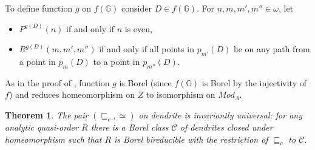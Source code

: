 \documentclass{amsart}
\newtheorem{theorem}{Theorem}[section]
\theoremstyle{definition}
\theoremstyle{remark}
\begin{document}
To define function $g$ on $f( {\mathbb{G}} )$ consider $D\in f( {\mathbb{G}} )$.
For $n,m,m',m''\in\omega $, let
\begin{itemize}
\item $P^{g(D)}(n)$ if and only if $n$ is even,
\item $R^{g(D)}(m,m',m'')$ if and only if all points in $p_{m'}(D)$
  lie on any path from a point in $p_m(D)$ to a point in
  $p_{m''}(D)$.
\end{itemize}
As in the proof of \cite[Lemma 6.5]{CDM2005}, function $g$ is Borel
(since $f({\mathbb{G}})$ is Borel by the injectivity of $f$) and reduces
homeomorphism on $Z$ to isomorphism on
$Mod_{\Lambda }$.

\begin{theorem}
The pair $(\sqsubseteq_c,\simeq )$ on dendrite is invariantly
universal: for any analytic quasi-order $R$ there is a Borel class $
\mathcal C $ of dendrites closed under homeomorphism such that $R$ is
Borel bireducible with the restriction of $\sqsubseteq_c$ to $ \mathcal C
$.
\end{theorem}
\end{document}
